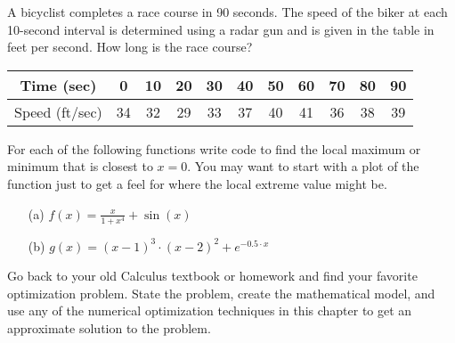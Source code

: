 \begin{problem}
    A bicyclist completes a race course in 90 seconds.  The speed of the biker at each
    10-second interval is determined using a radar gun and is given in the table in feet
    per second.  How long is the race course?
    \begin{center}
        \begin{tabular}{|c||c|c|c|c|c|c|c|c|c|c|}
            \hline
            Time (sec) &      0 & 10 & 20 & 30 & 40 & 50 & 60 & 70 & 80 & 90 \\ \hline
            Speed (ft/sec) & 34 & 32 & 29 & 33 & 37 & 40 & 41 & 36 & 38 & 39 \\
            \hline
        \end{tabular}
    \end{center}
\end{problem}

\begin{problem}
    For each of the following functions write code to find the local maximum or minimum
    that is closest to $x=0$.  You may want to start with a plot of the function just to
    get a feel for where the local extreme value might be.
    \begin{enumerate}
        \item[(a)] $\displaystyle f(x) = \frac{x}{1+x^4} + \sin(x)$
        \item[(b)] $\displaystyle g(x) =
            \left(x-1\right)^3\cdot\left(x-2\right)^2+e^{-0.5\cdot x}$
    \end{enumerate}
\end{problem}

\begin{problem}
    Go back to your old Calculus textbook or homework and find your favorite optimization
    problem.  State the problem, create the mathematical model, and use any of the numerical
    optimization techniques in this chapter to get an approximate solution to the problem.
\end{problem}


